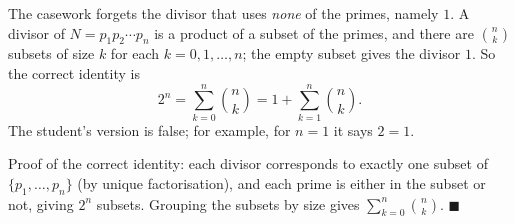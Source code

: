 The casework forgets the divisor that uses \emph{none} of the primes, namely $1$. A divisor of $N=p_1p_2\cdots p_n$ is a product of a subset of the primes, and there are $\binom nk$ subsets of size $k$ for each $k=0,1,\dots,n$; the empty subset gives the divisor $1$. So the correct identity is
\[
\boxed{2^n=\sum_{k=0}^{n}\binom nk=1+\sum_{k=1}^{n}\binom nk}.
\]
The student's version is false; for example, for $n=1$ it says $2=1$.

Proof of the correct identity: each divisor corresponds to exactly one subset of $\{p_1,\dots,p_n\}$ (by unique factorisation), and each prime is either in the subset or not, giving $2^n$ subsets. Grouping the subsets by size gives $\sum_{k=0}^n\binom nk$. $\blacksquare$
